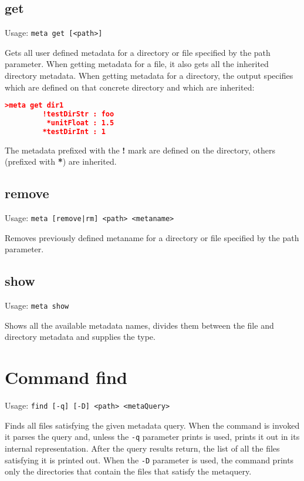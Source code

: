 \subsection{get}

Usage: \texttt{meta get [<path>]}

Gets all user defined metadata for a directory or file specified by
the path parameter. When getting metadata for a file, it also gets
all the inherited directory metadata. When getting metadata for a
directory, the output specifies which are defined on that concrete
directory and which are inherited:
\begin{lstlisting}[language=json]
>meta get dir1
         !testDirStr : foo
          *unitFloat : 1.5
         *testDirInt : 1
\end{lstlisting}
The metadata prefixed with the \textbf{!} mark are defined on the
directory, others (prefixed with \textbf{*}) are inherited.

\subsection{remove}

Usage: \texttt{meta [remove|rm] <path> <metaname>}

Removes previously defined metaname for a directory or file
specified by the path parameter.

\subsection{show}

Usage: \texttt{meta show}

Shows all the available metadata names, divides them between the
file and directory metadata and supplies the type.

\section{Command find}

Usage: \texttt{find [-q] [-D] <path> <metaQuery>}

Finds all files satisfying the given metadata query. When the
command is invoked it parses the query and, unless the \texttt{-q}
parameter prints is used, prints it out in its internal
representation. After the query results return, the list of all
the files satisfying it is printed out. When the \texttt{-D}
parameter is used, the command prints only the directories
that contain the files that satisfy the metaquery.

